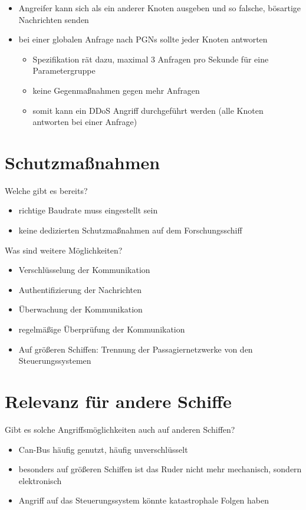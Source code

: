 \begin{itemize}
    \item Angreifer kann sich als ein anderer Knoten ausgeben und so falsche, bösartige Nachrichten senden
    \item bei einer globalen Anfrage nach PGNs sollte jeder Knoten antworten
    \begin{itemize}
        \item Spezifikation rät dazu, maximal 3 Anfragen pro Sekunde für eine Parametergruppe
        \item keine Gegenmaßnahmen gegen mehr Anfragen
        \item somit kann ein DDoS Angriff durchgeführt werden (alle Knoten antworten bei einer Anfrage)
    \end{itemize}
\end{itemize}

\cite{Murvay2018}

\section{Schutzmaßnahmen}
Welche gibt es bereits?
\begin{itemize}
    \item richtige Baudrate muss eingestellt sein
    \item keine dedizierten Schutzmaßnahmen auf dem Forschungsschiff
\end{itemize}
Was sind weitere Möglichkeiten?
\begin{itemize}
    \item Verschlüsselung der Kommunikation
    \item Authentifizierung der Nachrichten
    \item Überwachung der Kommunikation
    \item regelmäßige Überprüfung der Kommunikation
    \item Auf größeren Schiffen: Trennung der Passagiernetzwerke von den Steuerungssystemen
\end{itemize}

\section{Relevanz für andere Schiffe}
Gibt es solche Angriffsmöglichkeiten auch auf anderen Schiffen?
\begin{itemize}
    \item Can-Bus häufig genutzt, häufig unverschlüsselt
    \item besonders auf größeren Schiffen ist das Ruder nicht mehr mechanisch, sondern elektronisch
    \item Angriff auf das Steuerungssystem könnte katastrophale Folgen haben
\end{itemize}